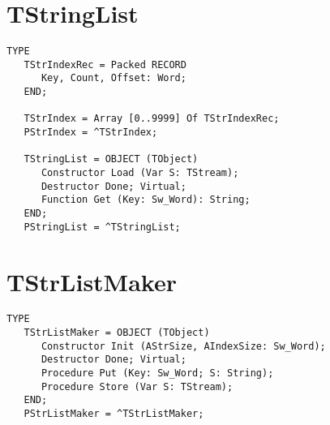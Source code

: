 \section{TStringList}
\label{se:TStringList}

\begin{verbatim}
TYPE
   TStrIndexRec = Packed RECORD
      Key, Count, Offset: Word;
   END;

   TStrIndex = Array [0..9999] Of TStrIndexRec;
   PStrIndex = ^TStrIndex;

   TStringList = OBJECT (TObject)
      Constructor Load (Var S: TStream);
      Destructor Done; Virtual;
      Function Get (Key: Sw_Word): String;
   END;
   PStringList = ^TStringList;
\end{verbatim}

\section{TStrListMaker}
\label{se:TStrListMaker}

\begin{verbatim}
TYPE
   TStrListMaker = OBJECT (TObject)
      Constructor Init (AStrSize, AIndexSize: Sw_Word);
      Destructor Done; Virtual;
      Procedure Put (Key: Sw_Word; S: String);
      Procedure Store (Var S: TStream);
   END;
   PStrListMaker = ^TStrListMaker;
\end{verbatim}

